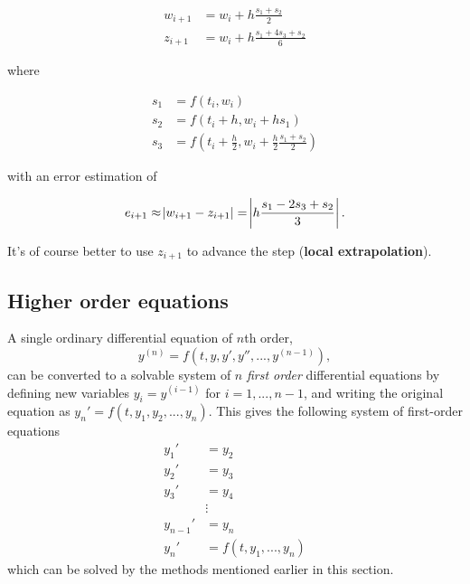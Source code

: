 \begin{align*}
w_{i+1} &= w_i + h \frac{s_1 +s_2}{2} \\
z_{i+1} &= w_i + h \frac{s_1 + 4s_3 + s_2}{6}
\end{align*}

where

\begin{align*}
    s_1 &= f(t_i,w_i) \\
    s_2 &= f(t_i + h,w_i + hs_1) \\
    s_3 &= f(t_i + \frac{h}{2},w_i + \frac{h}{2}\frac{s_1 + s_2}{2})
\end{align*}

with an error estimation of

$$
e_{i+1} \approx \abs{w_{i+1} - z_{i+1}} = \abs{h\frac{s_1 - 2s_3 + s_2}{3}}.
$$

It's of course better to use $z_{i+1}$ to advance the step (\textbf{local extrapolation}).

\subsection{Higher order equations}
A single ordinary differential equation of $n$th order,
$$
y^{(n)} = f(t,y,y',y'',...,y^{(n-1)}),
$$
can be converted to a solvable system of $n$ \textit{first order} differential equations by defining new variables $y_i = y^{(i-1)}$ for $i = 1,...,n-1$, and writing the original equation as $y_n' = f(t,y_1,y_2,...,y_n)$. This gives the following system of first-order equations
\begin{align*}
    y_1' &= y_2 \\
    y_2' &= y_3 \\
    y_3' &= y_4 \\
    &\vdots \\
    y_{n-1}' &= y_n \\
    y_n' &= f(t,y_1,...,y_n)
\end{align*}
which can be solved by the methods mentioned earlier in this section.
